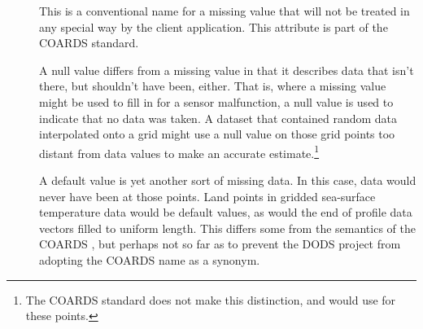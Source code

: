 \begin{description}
\item[]  This is a conventional name for a
  missing value that will not be treated in any special way by the
  client application.  This attribute is part of the COARDS standard.
  
\item[] A null value differs from a missing value in
  that it describes data that isn't there, but shouldn't have been,
  either.  That is, where a missing value might be used to fill in for
  a sensor malfunction, a null value is used to indicate that no data
  was taken.  A dataset that contained random data interpolated onto a
  grid might use a null value on those grid points too distant from
  data values to make an accurate estimate.\footnote{The COARDS
    standard does not make this distinction, and would use
     for these points.}

\item[]  A default value is yet another sort of
  missing data.  In this case, data would never have been at those
  points.  Land points in gridded sea-surface temperature data would
  be default values, as would the end of profile data vectors filled
  to uniform length.  This differs some from the semantics of the
  COARDS , but perhaps not so far as to prevent the
  DODS project from adopting the COARDS name as a synonym.

  
\end{description}


